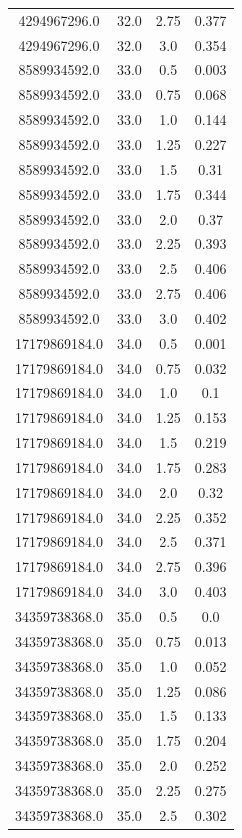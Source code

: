 \begin{tabular}{|c|c|c|c|}
4294967296.0 & 32.0 & 2.75 & 0.377 \\ 
4294967296.0 & 32.0 & 3.0 & 0.354 \\ 
8589934592.0 & 33.0 & 0.5 & 0.003 \\ 
8589934592.0 & 33.0 & 0.75 & 0.068 \\ 
8589934592.0 & 33.0 & 1.0 & 0.144 \\ 
8589934592.0 & 33.0 & 1.25 & 0.227 \\ 
8589934592.0 & 33.0 & 1.5 & 0.31 \\ 
8589934592.0 & 33.0 & 1.75 & 0.344 \\ 
8589934592.0 & 33.0 & 2.0 & 0.37 \\ 
8589934592.0 & 33.0 & 2.25 & 0.393 \\ 
8589934592.0 & 33.0 & 2.5 & 0.406 \\ 
8589934592.0 & 33.0 & 2.75 & 0.406 \\ 
8589934592.0 & 33.0 & 3.0 & 0.402 \\ 
17179869184.0 & 34.0 & 0.5 & 0.001 \\ 
17179869184.0 & 34.0 & 0.75 & 0.032 \\ 
17179869184.0 & 34.0 & 1.0 & 0.1 \\ 
17179869184.0 & 34.0 & 1.25 & 0.153 \\ 
17179869184.0 & 34.0 & 1.5 & 0.219 \\ 
17179869184.0 & 34.0 & 1.75 & 0.283 \\ 
17179869184.0 & 34.0 & 2.0 & 0.32 \\ 
17179869184.0 & 34.0 & 2.25 & 0.352 \\ 
17179869184.0 & 34.0 & 2.5 & 0.371 \\ 
17179869184.0 & 34.0 & 2.75 & 0.396 \\ 
17179869184.0 & 34.0 & 3.0 & 0.403 \\ 
34359738368.0 & 35.0 & 0.5 & 0.0 \\ 
34359738368.0 & 35.0 & 0.75 & 0.013 \\ 
34359738368.0 & 35.0 & 1.0 & 0.052 \\ 
34359738368.0 & 35.0 & 1.25 & 0.086 \\ 
34359738368.0 & 35.0 & 1.5 & 0.133 \\ 
34359738368.0 & 35.0 & 1.75 & 0.204 \\ 
34359738368.0 & 35.0 & 2.0 & 0.252 \\ 
34359738368.0 & 35.0 & 2.25 & 0.275 \\ 
34359738368.0 & 35.0 & 2.5 & 0.302 \\ 

\end{tabular}
